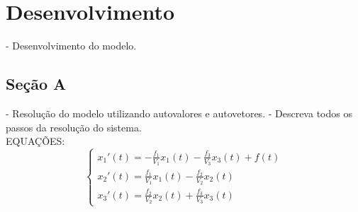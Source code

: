 \section{Desenvolvimento}

- Desenvolvimento do modelo.

\subsection{Seção A}

- Resolução do modelo utilizando autovalores e autovetores.
- Descreva todos os passos da resolução do sistema.
\\
EQUAÇÕES:
\begin{equation}
    \begin{cases}
      x_1'(t)=-\frac{f_1}{V_1}x_1(t)-\frac{f_3}{V_3}x_3(t)+f(t)\\[5pt]
      x_2'(t)=\frac{f_1}{V_1}x_1(t)-\frac{f_2}{V_2}x_2(t)\\[5pt]
      x_3'(t)=\frac{f_2}{V_2}x_2(t)+\frac{f_3}{V_3}x_3(t)
    \end{cases}
\end{equation}

